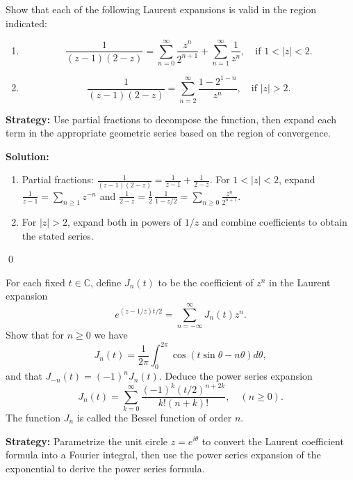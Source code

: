 \begin{problembox}
\begin{problemstatement}
Show that each of the following Laurent expansions is valid in the region indicated:
\begin{enumerate}[label=(\alph*)]
\item \[ \frac{1}{(z - 1)(2 - z)} = \sum_{n=0}^{\infty} \frac{z^n}{2^{n+1}} + \sum_{n=1}^{\infty} \frac{1}{z^n}, \quad \text{if } 1 < |z| < 2. \]
\item \[ \frac{1}{(z - 1)(2 - z)} = \sum_{n=2}^{\infty} \frac{1 - 2^{1-n}}{z^n}, \quad \text{if } |z| > 2. \]
\end{enumerate}
\end{problemstatement}
\end{problembox}

\noindent\textbf{Strategy:} Use partial fractions to decompose the function, then expand each term in the appropriate geometric series based on the region of convergence.

\bigskip\noindent\textbf{Solution:}
\begin{enumerate}[label=(\alph*)]
\item Partial fractions: $\frac{1}{(z-1)(2-z)}=\frac{1}{z-1}+\frac{1}{2-z}$. For $1<|z|<2$, expand $\frac{1}{z-1}=\sum_{n\ge1}z^{-n}$ and $\frac{1}{2-z}=\frac{1}{2}\,\frac{1}{1-z/2}=\sum_{n\ge0}\frac{z^n}{2^{n+1}}$.
\item For $|z|>2$, expand both in powers of $1/z$ and combine coefficients to obtain the stated series.
\end{enumerate}\qed


\begin{problembox}
\begin{problemstatement}
For each fixed \( t \in \mathbb{C} \), define \( J_n(t) \) to be the coefficient of \( z^n \) in the Laurent expansion
\[ e^{(z - 1/z)t/2} = \sum_{n=-\infty}^{\infty} J_n(t) z^n. \]
Show that for \( n \geq 0 \) we have
\[ J_n(t) = \frac{1}{2\pi} \int_0^{2\pi} \cos (t \sin \theta - n \theta) d\theta, \]
and that \( J_{-n}(t) = (-1)^n J_n(t) \). Deduce the power series expansion
\[ J_n(t) = \sum_{k=0}^{\infty} \frac{(-1)^k (t/2)^{n + 2k}}{k! (n + k)!}, \quad (n \geq 0). \]
The function \( J_n \) is called the Bessel function of order \( n \).
\end{problemstatement}
\end{problembox}

\noindent\textbf{Strategy:} Parametrize the unit circle \( z = e^{i\theta} \) to convert the Laurent coefficient formula into a Fourier integral, then use the power series expansion of the exponential to derive the power series formula.

